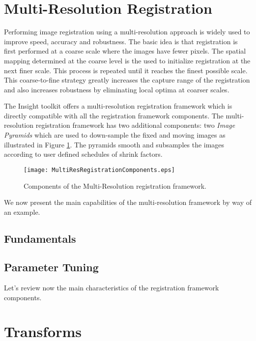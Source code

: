 \section{Multi-Resolution Registration}
\label{sec:MultiResolutionRegistration}
Performing image registration using a multi-resolution approach is widely used
to improve speed, accuracy and robustness. The basic idea is that registration
is first performed at a coarse scale where the images have fewer pixels.
The spatial mapping determined at the coarse level is the used to initialize
registration at the next finer scale. This process is repeated until it
reaches the finest possible scale. This coarse-to-fine strategy greatly
increases the capture range of the registration and also increases robustness
by eliminating local optima at coarser scales.

The Insight toolkit offers a multi-resolution registration framework which
is directly compatible with all the registration framework components. The
multi-resolution registration framework has two additional components:
two \emph{Image Pyramids} which are used to down-sample the fixed and moving
images as illustrated in Figure \ref{fig:MultiResRegistrationComponents}.
The pyramids smooth and subsamples the images according to user defined
schedules of shrink factors. 
 
\begin{figure}
\center
\texttt{[image: MultiResRegistrationComponents.eps]}
\caption{Components of the Multi-Resolution registration framework.}
\label{fig:MultiResRegistrationComponents}
\end{figure}
 
We now present the main capabilities of the multi-resolution framework by
way of an example.

\subsection{Fundamentals}


\subsection{Parameter Tuning}


Let's review now the main characteristics of the registration framework components. 

\section{Transforms}
\label{sec:Transforms}



